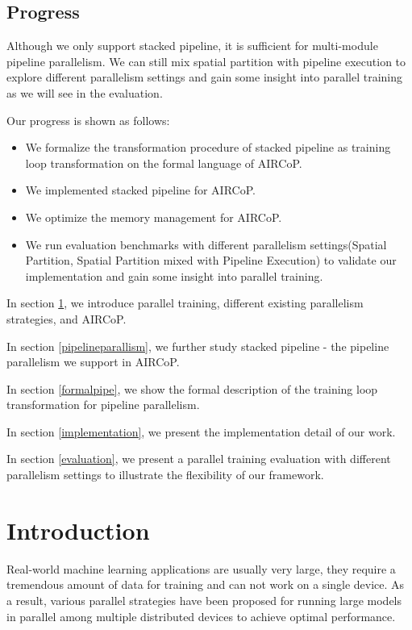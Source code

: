 \documentclass[sigplan]{acmart}\settopmatter{printfolios=true,printccs=false,printacmref=false}
\begin{document}
\subsection{Progress}
Although we only support stacked pipeline, it is sufficient for multi-module pipeline parallelism. We can still mix spatial partition with pipeline execution to explore different parallelism settings and gain some insight into parallel training as we will see in the evaluation.\par
Our progress is shown as follows:
\begin{itemize}
  \item We formalize the transformation procedure of stacked pipeline as training loop transformation on the formal language of AIRCoP.
  \item We implemented stacked pipeline for AIRCoP.
  \item We optimize the memory management for AIRCoP.
  \item We run evaluation benchmarks with different parallelism settings(Spatial Partition, Spatial Partition mixed with Pipeline Execution) to validate our implementation and gain some insight into parallel training.
\end{itemize} \par
In section \ref{introduction}, we introduce parallel training, different existing parallelism strategies, and AIRCoP.\par
In section \ref{pipelineparallism}, we further study stacked pipeline - the pipeline parallelism we support in AIRCoP.\par
In section \ref{formalpipe}, we show the formal description of the training loop transformation for pipeline parallelism.\par
In section \ref{implementation}, we present the implementation detail of our work.\par
In section \ref{evaluation}, we present a parallel training evaluation with different parallelism settings to illustrate the flexibility of our framework.
\section{Introduction} \label{introduction}
 Real-world machine learning applications are usually very large, they require a tremendous amount of data for training and can not work on a single device. As a result, various parallel strategies have been proposed for running large models in parallel among multiple distributed devices to achieve optimal performance.\par
\end{document}
